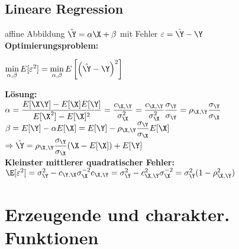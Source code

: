 \documentclass[german,color,6pt]{latex4ei/latex4ei_sheet}
\DeclareMathOperator{\W}{\textit{W}}				%
\DeclareMathOperator{\U}{\textit{U}}				%
\begin{document}
\begin{sectionbox}
	\subsection{Lineare Regression}
	affine Abbildung $\hat{\Y} = \alpha \X + \beta$ mit Fehler $\varepsilon = \hat{\Y} - \Y$\\
	\textbf{Optimierungsproblem:}
	\begin{emphbox}
	$\min\limits_{\alpha,\beta} E[\varepsilon^2] = \min\limits_{\alpha,\beta} E\left[\left(\hat{\Y}-\Y\right)^2\right]$
	\end{emphbox}
	\textbf{Lösung:}\\
	$\alpha = \dfrac{E[\X\Y]-E[\X]E[\Y]}{E[\X^2]-E[\X]^2} = \dfrac{c_{\X,\Y}}{\sigma^2_{\X}} = \dfrac{c_{\X,\Y}}{\sigma^2_{\X}}\dfrac{\sigma_{\Y}}{\sigma_{\Y}} = \rho_{\X,\Y}\dfrac{\sigma_{\Y}}{\sigma_{\X}}$\\
	$\beta = E[\Y] - \alpha E[\X] = E[\Y] - \rho_{\X,\Y}\dfrac{\sigma_{\Y}}{\sigma_{\X}}E[\X]$\\
	$\Rightarrow \hat{\Y} = \rho_{\X,\Y}\dfrac{\sigma_{\Y}}{\sigma_{\X}}(\X-E[\X])+E[\Y]$ \\
	\textbf{Kleinster mittlerer quadratischer Fehler:}\\
	$\E[\varepsilon^2]=\sigma_{\Y}^2-c_{\Y,\X}\sigma^{-2}_{\X}c_{\X,\Y}=\sigma_{\Y}^2-c_{\X,\Y}^2\sigma_{\X}^{-2}=\sigma_{\Y}^2(1-\rho_{\X,\Y}^2)$
\end{sectionbox}







\section{Erzeugende und charakter. Funktionen}
\end{document}
